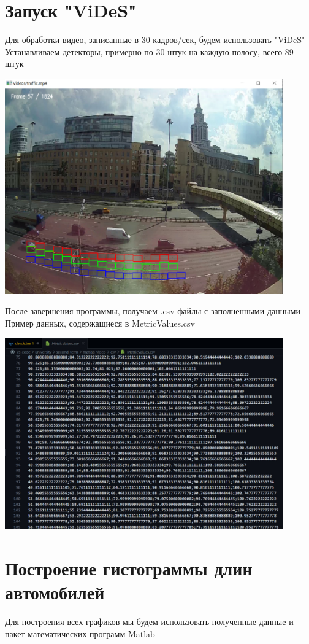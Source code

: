 \documentclass[a4paper,12pt]{article}
\begin{document}
\newpage
\section*{Запуск "ViDeS"}
Для обработки видео, записанные в 30 кадров/сек, будем использовать "ViDeS"\\
Устанавливаем детекторы, примерно по 30 штук на каждую полосу, всего 89 штук
\begin{center}
\includegraphics[width=0.9\textwidth]{vides_30_detectors.jpg}
\end{center}
После завершения программы, получаем .csv файлы с заполненными данными
Пример данных, содержащиеся в MetricValues.csv
\begin{center}
\includegraphics[width=0.9\textwidth]{vides_data.jpg}
\end{center}


\newpage
\section*{Построение гистограммы длин автомобилей}
Для построения всех графиков мы будем использовать полученные данные и пакет математических программ Matlab
\end{document}

